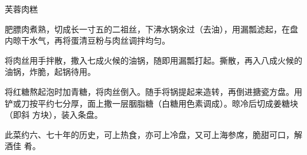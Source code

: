 \begin{recipe}{芙蓉肉糕}

\ingredients


\preparation

\step 肥膘肉煮熟，切成长一寸五的二祖丝，下沸水锅汆过（去油），用漏瓢滤起，在盘
内晾干水气，再将蛋清豆粉与肉丝调拌均匀。

\step 将肉丝用手拌散，撒入七成火候的油锅，随即用漏瓢打起。撕散，再入八成火候的
油锅，炸脆，起锅待用。

\step 将红糖熬起泡时加青糖，将肉丝倒入。随手将锅提起来造转，再倒进搪瓷方盘。用
铲或刀按平约七分厚，面上撒一层胭脂糖（白糖用色素调成）。晾冷后切成姜糖块（即斜
方块），装入条盘。

\features

此菜约六、七十年的历史，可上热食，亦可上冷盘，又可上海参席，脆甜可口，解酒佳
肴。

\end{recipe}

